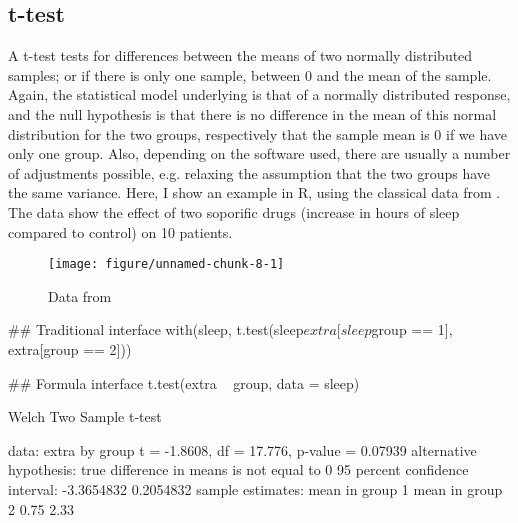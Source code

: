 \documentclass[a4paper,twoside]{tufte-book}\usepackage[]{graphicx}\usepackage[]{color}
\makeatletter
\def\maxwidth{ %
  \ifdim\Gin@nat@width>\linewidth
    \linewidth
  \else
    \Gin@nat@width
  \fi
}
\makeatother
\begin{document}
{\subsection{t-test}

A t-test tests for differences between the means of two normally distributed samples; or if there is only one sample, between 0 and the mean of the sample. Again, the statistical model underlying is that of a normally distributed response, and the null hypothesis is that there is no difference in the mean of this normal distribution for the two groups, respectively that the sample mean is 0 if we have only one group. Also, depending on the software used, there are usually a number of adjustments possible, e.g. relaxing the assumption that the two groups have the same variance. Here, I show an example in R, using the classical data from \citet{Student-probableerrormean-1908}. The data show the effect of two soporific drugs (increase in hours of sleep compared to control) on 10 patients. 

\begin{figure}[htbp]
\begin{center}
\begin{Schunk}

\texttt{[image: figure/unnamed-chunk-8-1]} \end{Schunk}
\caption{Data from \citet{Student-probableerrormean-1908}}
\label{fig: Student Sleep Data}
\end{center}
\end{figure}

\begin{Schunk}
\begin{Sinput}
## Traditional interface
with(sleep, t.test(sleep$extra[sleep$group == 1], extra[group == 2]))
\end{Sinput}
\end{Schunk}

\begin{Schunk}
\begin{Sinput}
## Formula interface
t.test(extra ~ group, data = sleep)
\end{Sinput}
\begin{Soutput}

	Welch Two Sample t-test

data:  extra by group
t = -1.8608, df = 17.776, p-value = 0.07939
alternative hypothesis: true difference in means is not equal to 0
95 percent confidence interval:
 -3.3654832  0.2054832
sample estimates:
mean in group 1 mean in group 2 
           0.75            2.33 
\end{Soutput}
\end{Schunk}

}
\end{document}
